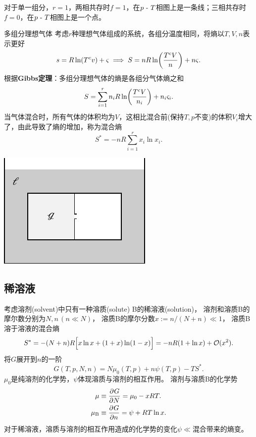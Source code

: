 \begin{corollary}
	对于单一组分，$r=1$，两相共存时$f=1$，在$p~\text{-}~ T$相图上是一条线；三相共存时$f=0$，在$p~\text{-}~ T$相图上是一个点。
\end{corollary}

\begin{example}
	{多组分理想气体}{}
	考虑$r$种理想气体组成的系统，各组分温度相同，将熵以$T,V,n$表示更好
	\[
		s=R\ln(T^cv)+\varsigma\implies S=nR\ln\biggl(\frac{T^cV}n\biggr)+n\varsigma.
	\]
	根据\textbf{Gibbs定理}：多组分理想气体的熵是各组分气体熵之和
	\[
		S=\sum_{i=1}^rn_iR\ln\biggl(\frac{T^cV}{n_i}\biggr)+n_i\varsigma_i.
	\]
	当气体混合时，所有气体的体积均为$V$，这相比混合前(保持$T,p$不变)的体积$V_i$增大了，由此导致了熵的增加，称为混合熵
	\begin{equation}
		\label{eq:mixing entropy}
		S^*=-nR\sum_{i=1}^rx_i\ln x_i.
	\end{equation}
	\begin{center}
		\includegraphics[page=4]{figures/tikz/layouts.pdf}
	\end{center}
\end{example}

\subsection{稀溶液}

考虑溶剂(solvent)中只有一种溶质(solute) B的稀溶液(solution)，
溶剂和溶质B的摩尔数分别为$N,n\,(n\ll N)$，
溶质B的摩尔分数$x:=n/(N+n)\ll 1$，
溶质B溶于溶液的混合熵
\begin{equation}
	S^*=-(N+n)R\Bigl[x\ln x+(1+x)\ln(1-x)\Bigr]=-nR(1+\ln x)+\mathcal O(x^2).
\end{equation}
将$G$展开到$n$的一阶
\[
	G(T,p,N,n)=N\mu_0(T,p)+n\psi(T,p)-TS^*.
\]
$\mu_0$是纯溶剂的化学势，$\psi$体现溶质与溶剂的相互作用。
溶剂与溶质B的化学势
\begin{subequations}
	\begin{align}
		\label{eq:mu solvent}
		\mu         & \equiv\frac{\partial^{{}}G}{\partial{N}^{{}}}=\mu_0-xRT.    \\
		\label{eq:mu solute}
		\mu_{\mathrm{B}} & \equiv\frac{\partial^{{}}G}{\partial{n}^{{}}}=\psi+RT\ln x.
	\end{align}
\end{subequations}
对于稀溶液，溶质与溶剂的相互作用造成的化学势的变化$\psi\ll$混合带来的熵变。

